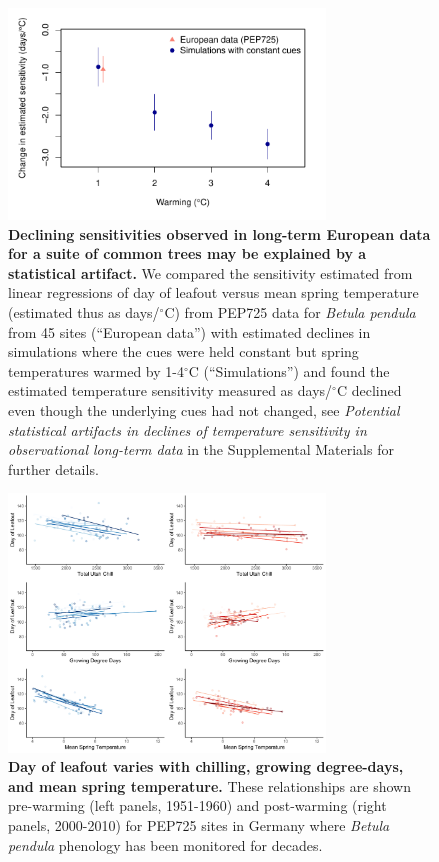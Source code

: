 \documentclass{article}
\begin{document}
\newpage
\begin{figure}[h!]
\centering
\noindent \includegraphics[width=0.75\textwidth]{..//..//analyses/bb_analysis/PEP_climate/figures/EDFig8_peprealandsims.pdf}
\caption{\textbf{Declining sensitivities observed in long-term European data for a suite of common trees may be explained by a statistical artifact.} We compared the sensitivity estimated from linear regressions of day of leafout versus mean spring temperature (estimated thus as days/$^{\circ}$C) from PEP725 data for \emph{Betula pendula} from 45 sites (``European data'') with estimated declines in simulations where the cues were held constant but spring temperatures warmed by 1-4$^{\circ}$C (``Simulations'') and found the estimated temperature sensitivity measured as days/$^{\circ}$C declined even though the underlying cues had not changed, see \emph{Potential statistical artifacts in declines of temperature sensitivity in observational long-term data} in the Supplemental Materials for further details.}
\label{fig:pepsims}
\end{figure}

\newpage
\begin{figure}[h!]
\centering
\noindent \includegraphics[width=0.75\textwidth]{..//..//analyses/bb_analysis/PEP_climate/figures/EDFig9_betpen_multruns_utahgddmat.pdf}
\caption{\textbf{Day of leafout varies with chilling, growing degree-days, and mean spring temperature.} These relationships are shown pre-warming (left panels, 1951-1960) and post-warming (right panels, 2000-2010) for PEP725 sites in Germany where \emph{Betula pendula} phenology has been monitored for decades.}
\label{fig:pep}
\end{figure}
\end{document}
